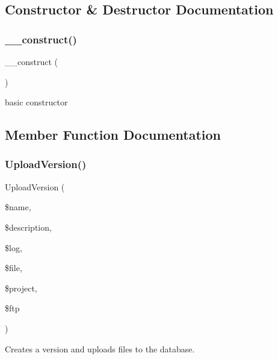 \subsection{Constructor \& Destructor Documentation}
\mbox{\label{class_version_controller_a095c5d389db211932136b53f25f39685}} 
\subsubsection{\texorpdfstring{\+\_\+\+\_\+construct()}{\_\_construct()}}
{\footnotesize\ttfamily \+\_\+\+\_\+construct (\begin{DoxyParamCaption}{ }\end{DoxyParamCaption})}



basic constructor 



\subsection{Member Function Documentation}
\mbox{\label{class_version_controller_a0c7a5c23984dfdfbda1320c4dbb834fc}} 
\subsubsection{\texorpdfstring{Upload\+Version()}{UploadVersion()}}
{\footnotesize\ttfamily Upload\+Version (\begin{DoxyParamCaption}\item[{}]{\$name,  }\item[{}]{\$description,  }\item[{}]{\$log,  }\item[{}]{\$file,  }\item[{}]{\$project,  }\item[{}]{\$ftp }\end{DoxyParamCaption})}



Creates a version and uploads files to the database. 


